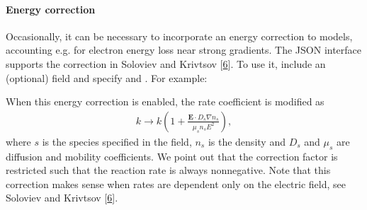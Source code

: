 \documentclass[letterpaper,10pt,english]{sphinxmanual}
\begin{document}
\paragraph{Energy correction}
\label{\detokenize{Applications/CdrPlasmaModel:energy-correction}}
Occasionally, it can be necessary to incorporate an energy correction to models, accounting e.g. for electron energy loss near strong gradients.
The JSON interface supports the correction in Soloviev and Krivtsov {[}\hyperlink{cite.ZZReferences:id101}{6}{]}.
To use it, include an (optional) field  and specify  and .
For example:

\begin{sphinxVerbatim}[commandchars=\\\{\},formatcom=\scriptsize]
  \PYG{p}{[}
       
       
       
       
       
       
       
       
       
       
       
       
         
         
  \PYG{p}{]}
\end{sphinxVerbatim}

When this energy correction is enabled, the rate coefficient is modified as
\begin{equation*}
\begin{split}k \rightarrow k\left(1 + \frac{\mathbf{E}\cdot D_s\nabla n_s}{\mu_s n_s E^2}\right),\end{split}
\end{equation*}
where \(s\) is the species specified in the  field, \(n_s\) is the density and \(D_s\) and \(\mu_s\) are diffusion and mobility coefficients.
We point out that the correction factor is restricted such that the reaction rate is always non\sphinxhyphen{}negative.
Note that this correction makes sense when rates are dependent only on the electric field, see Soloviev and Krivtsov {[}\hyperlink{cite.ZZReferences:id101}{6}{]}.
\end{document}

